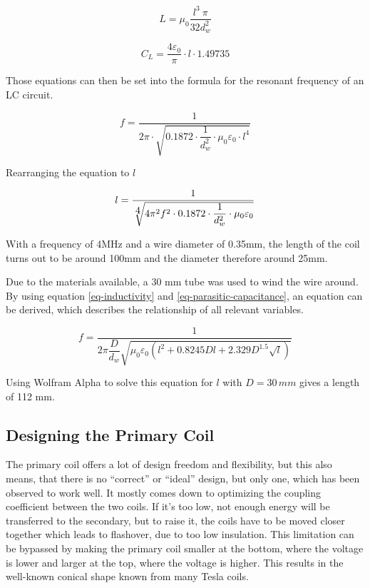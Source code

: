 \begin{equation}
    L = \mu_0 \frac{l^3\ \pi}{32 d_w^2}
\end{equation}

\begin{equation}
    C_L = \frac{4\varepsilon_0}{\pi} \cdot l \cdot 1.49735
\end{equation}

Those equations can then be set into the formula for the resonant frequency of an LC circuit.

\begin{equation}
    f = \frac{1}{2\pi \cdot \sqrt{0.1872 \cdot \dfrac{1}{d_w^2} \cdot \mu_0 \varepsilon_0 \cdot l^4}}
\end{equation}

Rearranging the equation to \(l\)

\begin{equation}
    l = \frac{1}{\sqrt[\scalebox{1}{4}]{4\pi^2 f^2 \cdot0.1872 \cdot \dfrac{1}{d_w^2} \cdot \mu_0 \varepsilon_0}}
\end{equation}

With a frequency of 4MHz and a wire diameter of 0.35mm, the length of the coil turns out to be around 100mm and the diameter therefore around 25mm.

Due to the materials available, a 30 mm tube was used to wind the wire around. By using equation \ref{eq-inductivity} and \ref{eq-parasitic-capacitance}, an equation can be derived, which describes the relationship of all relevant variables.

\begin{equation}
    f = \frac{1}{2\pi \dfrac{D}{d_w} \sqrt{\mu_0 \varepsilon_0 \left( l^2 + 0.8245 D l + 2.329 D^{1.5} \sqrt{l} \right)}}
\end{equation}

Using Wolfram Alpha to solve this equation for \(l\) with \(D = 30\,mm\) gives a length of 112 mm.

\subsection{Designing the Primary Coil}
\label{sec:designing-the-primary}

The primary coil offers a lot of design freedom and flexibility, but this also means, that there is no \enquote{correct} or \enquote{ideal} design, but only one, which has been observed to work well. It mostly comes down to optimizing the coupling coefficient between the two coils. If it's too low, not enough energy will be transferred to the secondary, but to raise it, the coils have to be moved closer together which leads to flashover, due to too low insulation. %
This limitation can be bypassed by making the primary coil smaller at the bottom, where the voltage is lower and larger at the top, where the voltage is higher. This results in the well-known conical shape known from many Tesla coils.

